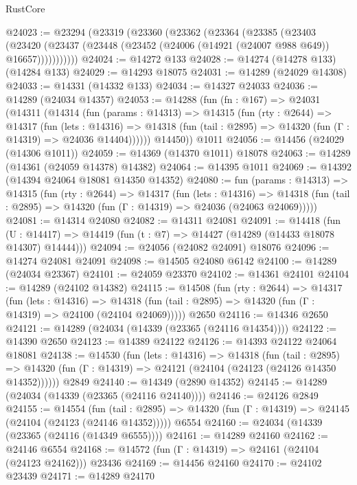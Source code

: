 \begin{lexlean}{RustCore}
\begin{coremodule}
@24023 := @23294
    (@23319
      (@23360
        (@23362
          (@23364
            (@23385
              (@23403
                (@23420
                  (@23437 (@23448 (@23452 (@24006 (@14921 (@24007 @988 @649)) @16657)))))))))))
@24024 := @14272 @133
@24028 := @14274 (@14278 @133) (@14284 @133)
@24029 := @14293 @18075
@24031 := @14289 (@24029 @14308)
@24033 := @14331 (@14332 @133)
@24034 := @14327 @24033
@24036 := @14289 (@24034 @14357)
@24053 := @14288
    (fun (fn : @167) =>
    @24031
      (@14311
        (@14314
          (fun (params : @14313) =>
          @14315
            (fun (rty : @2644) =>
            @14317
              (fun (lets : @14316) =>
              @14318 (fun (tail : @2895) => @14320 (fun (Γ : @14319) => @24036 @14404))))))
        @14450))
    @1011
@24056 := @14456 (@24029 (@14306 @1011))
@24059 := @14369 (@14370 @1011) @18078
@24063 := @14289 (@14361 (@24059 @14378) @14382)
@24064 := @14395 @1011
@24069 := @14392 (@14394 @24064 @18081 @14350 @14352)
@24080 := fun (params : @14313) =>
  @14315
    (fun (rty : @2644) =>
    @14317
      (fun (lets : @14316) =>
      @14318 (fun (tail : @2895) => @14320 (fun (Γ : @14319) => @24036 (@24063 @24069)))))
@24081 := @14314 @24080
@24082 := @14311 @24081
@24091 := @14418
    (fun (U : @14417) => @14419 (fun (t : @7) => @14427 (@14289 (@14433 @18078 @14307) @14444)))
@24094 := @24056 (@24082 @24091) @18076
@24096 := @14274 @24081 @24091
@24098 := @14505 @24080 @6142
@24100 := @14289 (@24034 @23367)
@24101 := @24059 @23370
@24102 := @14361 @24101
@24104 := @14289 (@24102 @14382)
@24115 := @14508
    (fun (rty : @2644) =>
    @14317
      (fun (lets : @14316) =>
      @14318 (fun (tail : @2895) => @14320 (fun (Γ : @14319) => @24100 (@24104 @24069)))))
    @2650
@24116 := @14346 @2650
@24121 := @14289 (@24034 (@14339 (@23365 (@24116 @14354))))
@24122 := @14390 @2650
@24123 := @14389 @24122
@24126 := @14393 @24122 @24064 @18081
@24138 := @14530
    (fun (lets : @14316) =>
    @14318
      (fun (tail : @2895) =>
      @14320 (fun (Γ : @14319) => @24121 (@24104 (@24123 (@24126 @14350 @14352))))))
    @2849
@24140 := @14349 (@2890 @14352)
@24145 := @14289 (@24034 (@14339 (@23365 (@24116 @24140))))
@24146 := @24126 @2849
@24155 := @14554
    (fun (tail : @2895) => @14320 (fun (Γ : @14319) => @24145 (@24104 (@24123 (@24146 @14352)))))
    @6554
@24160 := @24034 (@14339 (@23365 (@24116 (@14349 @6555))))
@24161 := @14289 @24160
@24162 := @24146 @6554
@24168 := @14572 (fun (Γ : @14319) => @24161 (@24104 (@24123 @24162))) @23436
@24169 := @14456 @24160
@24170 := @24102 @23439
@24171 := @14289 @24170

\end{coremodule}
\end{lexlean}
